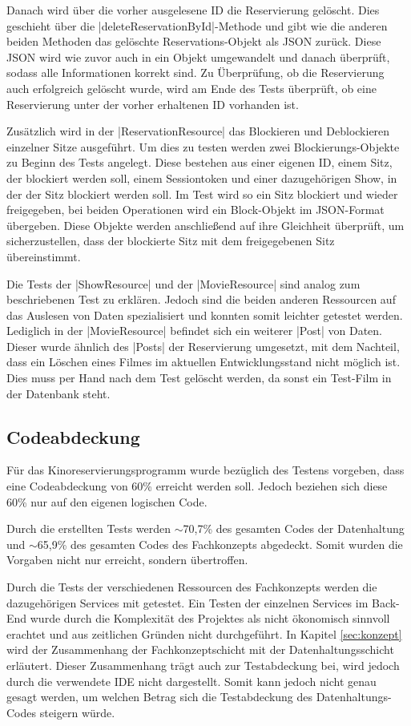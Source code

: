Danach wird über die vorher ausgelesene ID die Reservierung gelöscht.
Dies geschieht über die \jinline |deleteReservationById|-Methode und gibt wie die anderen beiden Methoden das gelöschte Reservations-Objekt als \acs{JSON} zurück.
Diese \acs{JSON} wird wie zuvor auch in ein Objekt umgewandelt und danach überprüft, sodass alle Informationen korrekt sind.
Zu Überprüfung, ob die Reservierung auch erfolgreich gelöscht wurde, wird am Ende des Tests überprüft, ob eine Reservierung unter der vorher erhaltenen ID vorhanden ist.

Zusätzlich wird in der \jinline |ReservationResource| das Blockieren und Deblockieren einzelner Sitze ausgeführt.
Um dies zu testen werden zwei Blockierungs-Objekte zu Beginn des Tests angelegt.
Diese bestehen aus einer eigenen ID, einem Sitz, der blockiert werden soll, einem Sessiontoken und einer dazugehörigen Show, in der der Sitz blockiert werden soll.
Im Test wird so ein Sitz blockiert und wieder freigegeben, bei beiden Operationen wird ein Block-Objekt im \acs{JSON}-Format übergeben.
Diese Objekte werden anschließend auf ihre Gleichheit überprüft, um sicherzustellen, dass der blockierte Sitz mit dem freigegebenen Sitz übereinstimmt.

Die Tests der \jinline |ShowResource| und der \jinline |MovieResource| sind analog zum beschriebenen Test zu erklären.
Jedoch sind die beiden anderen Ressourcen auf das Auslesen von Daten spezialisiert und konnten somit leichter getestet werden.
Lediglich in der \jinline |MovieResource| befindet sich ein weiterer \jinline |Post| von Daten.
Dieser wurde ähnlich des \jinline |Posts| der Reservierung umgesetzt, mit dem Nachteil, dass ein Löschen eines Filmes im aktuellen Entwicklungsstand nicht möglich ist.
Dies muss per Hand nach dem Test gelöscht werden, da sonst ein Test-Film in der Datenbank steht.

\subsection{Codeabdeckung} 
\label{sec:codeabdeckung}
Für das Kinoreservierungsprogramm wurde bezüglich des Testens vorgeben, dass eine Codeabdeckung von 60\% erreicht werden soll.
Jedoch beziehen sich diese 60\% nur auf den eigenen logischen Code.

Durch die erstellten Tests werden $\sim$70,7\% des gesamten Codes der Datenhaltung und $\sim$65,9\% des gesamten Codes des Fachkonzepts abgedeckt.
Somit wurden die Vorgaben nicht nur erreicht, sondern übertroffen.

Durch die Tests der verschiedenen Ressourcen des Fachkonzepts werden die dazugehörigen Services mit getestet.
Ein Testen der einzelnen Services im Back-End wurde durch die Komplexität des Projektes als nicht ökonomisch sinnvoll erachtet und aus zeitlichen Gründen nicht durchgeführt.
In Kapitel \vref{sec:konzept} wird der Zusammenhang der Fachkonzeptschicht mit der Datenhaltungsschicht erläutert.
Dieser Zusammenhang trägt auch zur Testabdeckung bei, wird jedoch durch die verwendete \acs{IDE} nicht dargestellt.
Somit kann jedoch nicht genau gesagt werden, um welchen Betrag sich die Testabdeckung des Datenhaltungs-Codes steigern würde.

